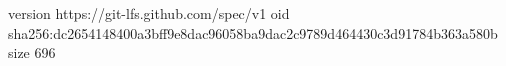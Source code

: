 version https://git-lfs.github.com/spec/v1
oid sha256:dc2654148400a3bff9e8dac96058ba9dac2c9789d464430c3d91784b363a580b
size 696
